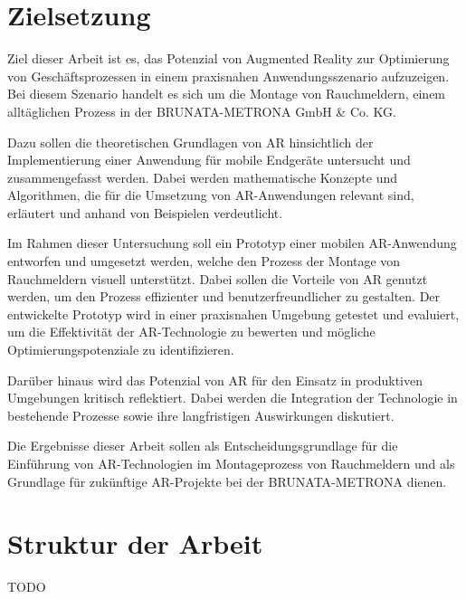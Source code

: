 \section{Zielsetzung}

Ziel dieser Arbeit ist es, das Potenzial von Augmented Reality zur Optimierung von Geschäftsprozessen in einem praxisnahen Anwendungsszenario aufzuzeigen. Bei diesem Szenario handelt es sich um die Montage von Rauchmeldern, einem alltäglichen Prozess in der BRUNATA-METRONA GmbH \& Co. KG.

Dazu sollen die theoretischen Grundlagen von AR hinsichtlich der Implementierung einer Anwendung für  mobile Endgeräte untersucht und zusammengefasst werden. Dabei werden mathematische Konzepte und Algorithmen, die für die Umsetzung von AR-Anwendungen relevant sind, erläutert und anhand von Beispielen verdeutlicht. 

Im Rahmen dieser Untersuchung soll ein Prototyp einer mobilen AR-Anwendung entworfen und umgesetzt werden, welche den Prozess der Montage von Rauchmeldern visuell unterstützt. Dabei sollen die Vorteile von AR genutzt werden, um den Prozess effizienter und benutzerfreundlicher zu gestalten. Der entwickelte Prototyp wird in einer praxisnahen Umgebung getestet und evaluiert, um die Effektivität der AR-Technologie zu bewerten und mögliche Optimierungspotenziale zu identifizieren.

Darüber hinaus wird das Potenzial von AR für den Einsatz in produktiven Umgebungen kritisch reflektiert. Dabei werden die Integration der Technologie in bestehende Prozesse sowie ihre langfristigen Auswirkungen diskutiert.

Die Ergebnisse dieser Arbeit sollen als Entscheidungsgrundlage für die Einführung von AR-Technologien im Montageprozess von Rauchmeldern und als Grundlage für zukünftige AR-Projekte bei der BRUNATA-METRONA dienen.

\section{Struktur der Arbeit}

TODO

